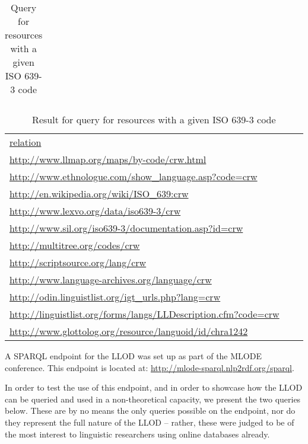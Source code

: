 
\begin{center}
\begin{table*}[t!hbp]
\caption{Query for resources with a given ISO 639-3 code} \label{t1}
\begin{tabular}{lll}
\hline
{\footnotesize } \\
\hline
\end{tabular}
\end{table*}
\end{center}

\begin{table*}[b!htp]
\caption{Result for query for resources with a given ISO 639-3 code} \label{t2}
\begin{tabular}{lll}
\hline
\url{relation} \\
\url{http://www.llmap.org/maps/by-code/crw.html} \\
\url{http://www.ethnologue.com/show_language.asp?code=crw} \\
\url{http://en.wikipedia.org/wiki/ISO_639:crw} \\
\url{http://www.lexvo.org/data/iso639-3/crw} \\
\url{http://www.sil.org/iso639-3/documentation.asp?id=crw} \\
\url{http://multitree.org/codes/crw} \\
\url{http://scriptsource.org/lang/crw} \\
\url{http://www.language-archives.org/language/crw} \\
\url{http://odin.linguistlist.org/igt_urls.php?lang=crw} \\
\url{http://linguistlist.org/forms/langs/LLDescription.cfm?code=crw} \\
\url{http://www.glottolog.org/resource/languoid/id/chra1242} \\
\hline
\end{tabular}
\end{table*}

A SPARQL endpoint for the LLOD was set up as part of the MLODE conference. This endpoint is located at: \url{http://mlode-sparql.nlp2rdf.org/sparql}. 

In order to test the use of this endpoint, and in order to showcase how the LLOD can be queried and used in a non-theoretical capacity, we present the two queries below. These are by no means the only queries possible on the endpoint, nor do they represent the full nature of the LLOD -- rather, these were judged to be of the most interest to linguistic researchers using online databases already. 

